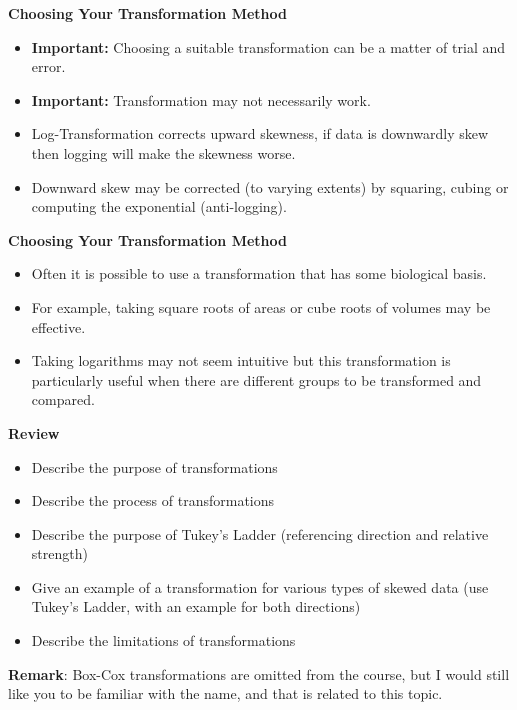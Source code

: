 \documentclass{beamer}
\begin{document}
\begin{frame}
	\Large
	\textbf{Choosing Your Transformation Method}
\begin{itemize}
\item \textbf{Important: }Choosing a suitable transformation can be a matter of trial and error.  \bigskip
\item \textbf{Important: }Transformation may not necessarily work.  \bigskip
\item Log-Transformation corrects upward skewness, if data is downwardly skew then logging will make the skewness worse. \bigskip
\item Downward skew may be corrected (to varying extents) by squaring, cubing or computing the exponential (anti-logging).
\end{itemize}

\end{frame}
\begin{frame}
	\Large
	\textbf{Choosing Your Transformation Method}
	\begin{itemize}
\item Often it is possible to use a transformation that has some biological basis. \bigskip
\item For example, taking square roots of areas or cube roots of volumes may be effective.  \bigskip
\item Taking logarithms may not seem intuitive but this transformation is particularly useful when there are different groups to be transformed and compared. 
	\end{itemize}
\end{frame}
\begin{frame}
	\large
	\vspace{-0.8cm}
\textbf{Review}
\begin{itemize}
	\item Describe the purpose of transformations
	\item Describe the process of transformations
	\item Describe the purpose of Tukey's Ladder (referencing direction and relative strength)
	\item Give an example of a transformation for various types of skewed data (use Tukey's Ladder, with an example for both directions)
	\item Describe the limitations of transformations
	\end{itemize}	
\bigskip
\textbf{Remark}: Box-Cox transformations are omitted from the course, but I would still like you to be familiar with the name, and that is related to this topic.
	\end{frame}

\end{document}
